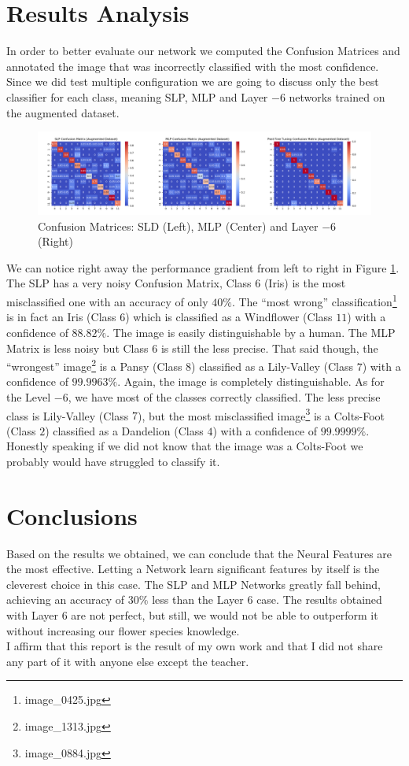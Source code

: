 \documentclass[10pt,a4paper]{report}
\begin{document}
\section{Results Analysis}
In order to better evaluate our network we computed the Confusion Matrices and annotated the image that was incorrectly classified with the most confidence. Since we did test multiple configuration we are going to discuss only the best classifier for each class, meaning SLP, MLP and Layer $-6$ networks trained on the augmented dataset. 
\begin{figure}[!ht]
\centering
\includegraphics[width=\linewidth]{conf_mat.png}
\caption{Confusion Matrices: SLD (Left), MLP (Center) and Layer $-6$ (Right)}
\label{fig:confmat}
\end{figure} 
We can notice right away the performance gradient from left to right in Figure \ref{fig:confmat}. The SLP has a very noisy Confusion Matrix, Class $6$ (Iris) is the most misclassified one with an accuracy of only $40 \%$. The \enquote{most wrong} classification\footnote{image\_0425.jpg} is in fact an Iris (Class $6$) which is classified as a Windflower (Class $11$) with a confidence of $88.82 \%$. The image is easily distinguishable by a human. The MLP Matrix is less noisy but Class $6$ is still the less precise. That said though, the \enquote{wrongest} image\footnote{image\_1313.jpg} is a Pansy (Class $8$) classified as a Lily-Valley (Class $7$) with a confidence of $99.9963 \%$. Again, the image is completely distinguishable. As for the Level $-6$, we have most of the classes correctly classified. The less precise class is Lily-Valley (Class $7$), but the most misclassified image\footnote{image\_0884.jpg} is a Colts-Foot (Class $2$) classified as a Dandelion (Class $4$) with a confidence of $99.9999 \%$. Honestly speaking if we did not know that the image was a Colts-Foot we probably would have struggled to classify it. 
\section{Conclusions}
Based on the results we obtained, we can conclude that the Neural Features are the most effective. Letting a Network learn significant features by itself is the cleverest choice in this case. The SLP and MLP Networks greatly fall behind, achieving an accuracy of $30 \%$ less than the Layer $6$ case. The results obtained with Layer $6$ are not perfect, but still, we would not be able to outperform it without increasing our flower species knowledge. 
\vspace*{\fill}
\\
I affirm that this report is the result of my own work and that I did not share any part of it with anyone else except the teacher.
\\
\end{document}
